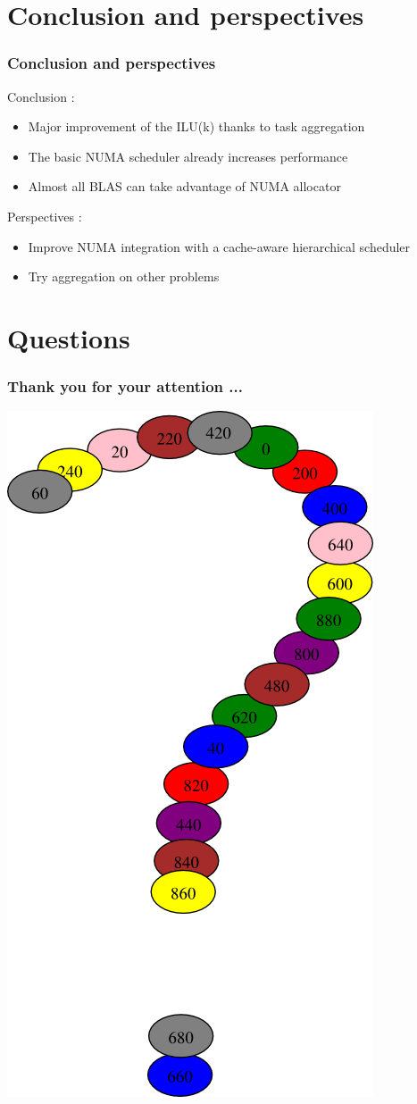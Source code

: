 \documentclass{beamer}
\begin{document}
\section{Conclusion and perspectives}
\begin{frame}
  \frametitle{Conclusion and perspectives}
  	 Conclusion :
    \begin{itemize}
      \item<1-> Major improvement of the ILU(k) thanks to task aggregation
      \item<2-> The basic NUMA scheduler already increases performance
      \item<3-> Almost all BLAS can take advantage of NUMA allocator
    \end{itemize}
    \pause
    \pause
    \pause

 	 \bigskip
 	 \bigskip

    Perspectives :
    \begin{itemize}
      \item<4-> Improve NUMA integration with a cache-aware hierarchical scheduler
      \item<5-> Try aggregation on other problems
    \end{itemize}
\end{frame}

\section*{Questions}
\begin{frame}
  \frametitle{Thank you for your attention ...}
  
  \centerline{\includegraphics[width=0.25\linewidth]{questions}}
\end{frame}
\end{document}
